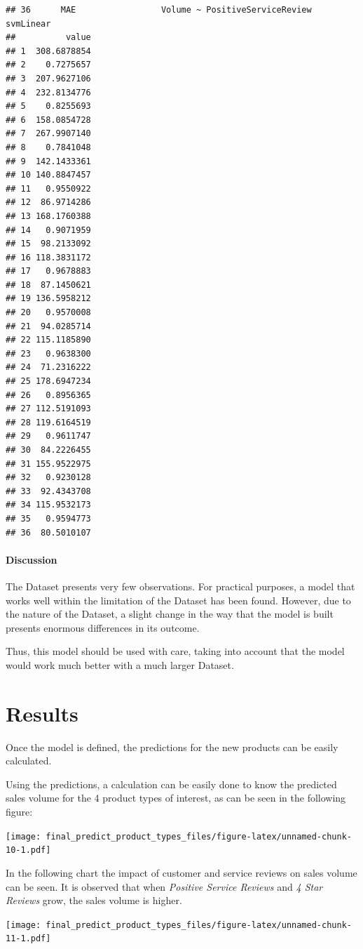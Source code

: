 \documentclass[]{article}
\let\oldparagraph\paragraph
\renewcommand{\paragraph}[1]{\oldparagraph{#1}\mbox{}}
\begin{document}
\begin{verbatim}
## 36      MAE                 Volume ~ PositiveServiceReview svmLinear
##          value
## 1  308.6878854
## 2    0.7275657
## 3  207.9627106
## 4  232.8134776
## 5    0.8255693
## 6  158.0854728
## 7  267.9907140
## 8    0.7841048
## 9  142.1433361
## 10 140.8847457
## 11   0.9550922
## 12  86.9714286
## 13 168.1760388
## 14   0.9071959
## 15  98.2133092
## 16 118.3831172
## 17   0.9678883
## 18  87.1450621
## 19 136.5958212
## 20   0.9570008
## 21  94.0285714
## 22 115.1185890
## 23   0.9638300
## 24  71.2316222
## 25 178.6947234
## 26   0.8956365
## 27 112.5191093
## 28 119.6164519
## 29   0.9611747
## 30  84.2226455
## 31 155.9522975
## 32   0.9230128
## 33  92.4343708
## 34 115.9532173
## 35   0.9594773
## 36  80.5010107
\end{verbatim}

\hypertarget{discussion}{%
\paragraph{Discussion}\label{discussion}}

The Dataset presents very few observations. For practical purposes, a
model that works well within the limitation of the Dataset has been
found. However, due to the nature of the Dataset, a slight change in the
way that the model is built presents enormous differences in its
outcome.

Thus, this model should be used with care, taking into account that the
model would work much better with a much larger Dataset.

\hypertarget{results}{%
\section{Results}\label{results}}

Once the model is defined, the predictions for the new products can be
easily calculated.

Using the predictions, a calculation can be easily done to know the
predicted sales volume for the 4 product types of interest, as can be
seen in the following figure:

\texttt{[image: final\_predict\_product\_types\_files/figure-latex/unnamed-chunk-10-1.pdf]}

In the following chart the impact of customer and service reviews on
sales volume can be seen. It is observed that when \emph{Positive
Service Reviews} and \emph{4 Star Reviews} grow, the sales volume is
higher.

\texttt{[image: final\_predict\_product\_types\_files/figure-latex/unnamed-chunk-11-1.pdf]}
\end{document}
